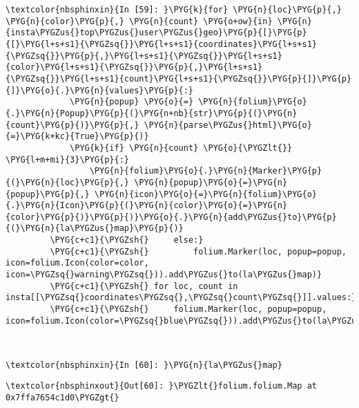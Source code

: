 \documentclass[letterpaper,10pt,english]{sphinxmanual}
\begin{document}
%
\begin{Verbatim}[commandchars=\\\{\}]
\textcolor{nbsphinxin}{In [59]: }\PYG{k}{for} \PYG{n}{loc}\PYG{p}{,} \PYG{n}{color}\PYG{p}{,} \PYG{n}{count} \PYG{o+ow}{in} \PYG{n}{insta\PYGZus{}top\PYGZus{}user\PYGZus{}geo}\PYG{p}{[}\PYG{p}{[}\PYG{l+s+s1}{\PYGZsq{}}\PYG{l+s+s1}{coordinates}\PYG{l+s+s1}{\PYGZsq{}}\PYG{p}{,}\PYG{l+s+s1}{\PYGZsq{}}\PYG{l+s+s1}{color}\PYG{l+s+s1}{\PYGZsq{}}\PYG{p}{,}\PYG{l+s+s1}{\PYGZsq{}}\PYG{l+s+s1}{count}\PYG{l+s+s1}{\PYGZsq{}}\PYG{p}{]}\PYG{p}{]}\PYG{o}{.}\PYG{n}{values}\PYG{p}{:}
             \PYG{n}{popup} \PYG{o}{=} \PYG{n}{folium}\PYG{o}{.}\PYG{n}{Popup}\PYG{p}{(}\PYG{n+nb}{str}\PYG{p}{(}\PYG{n}{count}\PYG{p}{)}\PYG{p}{,} \PYG{n}{parse\PYGZus{}html}\PYG{o}{=}\PYG{k+kc}{True}\PYG{p}{)}
             \PYG{k}{if} \PYG{n}{count} \PYG{o}{\PYGZlt{}} \PYG{l+m+mi}{3}\PYG{p}{:}
                 \PYG{n}{folium}\PYG{o}{.}\PYG{n}{Marker}\PYG{p}{(}\PYG{n}{loc}\PYG{p}{,} \PYG{n}{popup}\PYG{o}{=}\PYG{n}{popup}\PYG{p}{,} \PYG{n}{icon}\PYG{o}{=}\PYG{n}{folium}\PYG{o}{.}\PYG{n}{Icon}\PYG{p}{(}\PYG{n}{color}\PYG{o}{=}\PYG{n}{color}\PYG{p}{)}\PYG{p}{)}\PYG{o}{.}\PYG{n}{add\PYGZus{}to}\PYG{p}{(}\PYG{n}{la\PYGZus{}map}\PYG{p}{)}
         \PYG{c+c1}{\PYGZsh{}     else:}
         \PYG{c+c1}{\PYGZsh{}         folium.Marker(loc, popup=popup, icon=folium.Icon(color=color, icon=\PYGZsq{}warning\PYGZsq{})).add\PYGZus{}to(la\PYGZus{}map)}
         \PYG{c+c1}{\PYGZsh{} for loc, count in insta[[\PYGZsq{}coordinates\PYGZsq{},\PYGZsq{}count\PYGZsq{}]].values:}
         \PYG{c+c1}{\PYGZsh{}     folium.Marker(loc, popup=popup, icon=folium.Icon(color=\PYGZsq{}blue\PYGZsq{})).add\PYGZus{}to(la\PYGZus{}map)}
         
         
\end{Verbatim}

%
\begin{Verbatim}[commandchars=\\\{\}]
\textcolor{nbsphinxin}{In [60]: }\PYG{n}{la\PYGZus{}map}
\end{Verbatim}

%
\begin{Verbatim}[commandchars=\\\{\}]
\textcolor{nbsphinxout}{Out[60]: }\PYGZlt{}folium.folium.Map at 0x7ffa7654c1d0\PYGZgt{}
\end{Verbatim}
\end{document}
